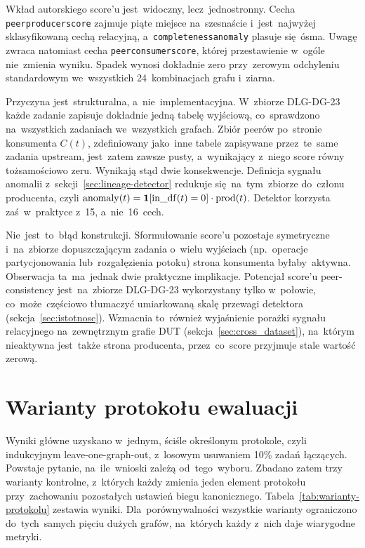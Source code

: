 \documentclass[polish,master,a4paper,oneside]{ppfcmthesis}
\renewcommand{\_}{\origtextunderscore\ifmmode\else\allowbreak\fi}
\begin{document}
Wkład autorskiego score'u jest~widoczny, lecz~jednostronny.
Cecha \texttt{peer\_producer\_score} zajmuje piąte miejsce na~szesnaście
i~jest~najwyżej sklasyfikowaną cechą relacyjną,
a~\texttt{completeness\_anomaly} plasuje się~ósma. Uwagę zwraca natomiast
cecha \texttt{peer\_consumer\_score}, której przestawienie w~ogóle nie~zmienia
wyniku. Spadek wynosi dokładnie zero przy~zerowym odchyleniu
standardowym we~wszystkich 24~kombinacjach grafu i~ziarna.

Przyczyna jest~strukturalna, a~nie~implementacyjna. W~zbiorze DLG-DG-23
każde zadanie zapisuje dokładnie jedną tabelę wyjściową, co~sprawdzono
na~wszystkich zadaniach we~wszystkich grafach. Zbiór peerów po~stronie
konsumenta $C(t)$, zdefiniowany jako~inne tabele zapisywane przez~te~same
zadania upstream, jest~zatem zawsze pusty, a~wynikający z~niego score równy
tożsamościowo zeru. Wynikają stąd dwie konsekwencje. Definicja sygnału
anomalii z~sekcji~\ref{sec:lineage-detector} redukuje się~na~tym~zbiorze
do~członu producenta, czyli
$\mathrm{anomaly}(t) = \mathbf{1}[\mathrm{in\_df}(t) = 0] \cdot \mathrm{prod}(t)$.
Detektor korzysta zaś~w~praktyce z~15, a~nie~16~cech.

Nie~jest~to~błąd konstrukcji. Sformułowanie score'u pozostaje symetryczne
i~na~zbiorze dopuszczającym zadania o~wielu wyjściach (np.~operacje
partycjonowania lub~rozgałęzienia potoku) strona konsumenta byłaby~aktywna.
Obserwacja ta~ma~jednak dwie praktyczne implikacje. Potencjał score'u
peer-consistency jest~na~zbiorze DLG-DG-23 wykorzystany tylko w~połowie,
co~może~częściowo tłumaczyć umiarkowaną skalę przewagi detektora
(sekcja~\ref{sec:istotnosc}). Wzmacnia to~również wyjaśnienie porażki
sygnału relacyjnego na~zewnętrznym grafie DUT
(sekcja~\ref{sec:cross_dataset}), na~którym nieaktywna jest~także strona
producenta, przez~co~score przyjmuje stale wartość zerową.

\section{Warianty protokołu ewaluacji}
\label{sec:warianty-protokolu}

Wyniki główne uzyskano w~jednym, ściśle określonym protokole, czyli indukcyjnym
leave-one-graph-out, z~losowym usuwaniem 10\% zadań łączących. Powstaje
pytanie, na~ile~wnioski zależą od~tego~wyboru. Zbadano zatem trzy warianty
kontrolne, z~których każdy zmienia jeden element protokołu przy~zachowaniu
pozostałych ustawień biegu kanonicznego. Tabela~\ref{tab:warianty-protokolu}
zestawia wyniki. Dla~porównywalności wszystkie warianty ograniczono
do~tych~samych pięciu dużych grafów, na~których każdy z~nich daje wiarygodne
metryki.
\end{document}

